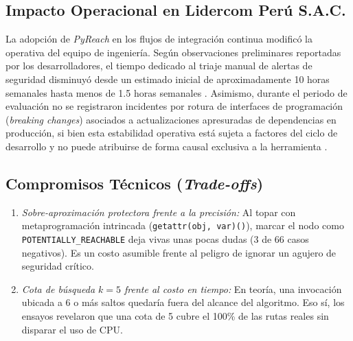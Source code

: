 \documentclass[conference]{IEEEtran}
\begin{document}
\subsection{Impacto Operacional en Lidercom Perú S.A.C.}
La adopción de \textit{PyReach} en los flujos de integración continua modificó la operativa del equipo de ingeniería. Según observaciones preliminares reportadas por los desarrolladores, el tiempo dedicado al triaje manual de alertas de seguridad disminuyó desde un estimado inicial de aproximadamente 10 horas semanales hasta menos de 1.5 horas semanales . Asimismo, durante el periodo de evaluación no se registraron incidentes por rotura de interfaces de programación (\textit{breaking changes}) asociados a actualizaciones apresuradas de dependencias en producción, si bien esta estabilidad operativa está sujeta a factores del ciclo de desarrollo y no puede atribuirse de forma causal exclusiva a la herramienta .

\subsection{Compromisos Técnicos (\textit{Trade-offs})}
\begin{enumerate}
    \item \textit{Sobre-aproximación protectora frente a la precisión:} Al topar con metaprogramación intrincada (\texttt{getattr(obj, var)()}), marcar el nodo como \texttt{POTENTIALLY\_REACHABLE} deja vivas unas pocas dudas (3 de 66 casos negativos). Es un costo asumible frente al peligro de ignorar un agujero de seguridad crítico.
    \item \textit{Cota de búsqueda $k=5$ frente al costo en tiempo:} En teoría, una invocación ubicada a 6 o más saltos quedaría fuera del alcance del algoritmo. Eso sí, los ensayos revelaron que una cota de 5 cubre el 100\% de las rutas reales sin disparar el uso de CPU.
\end{enumerate}
\end{document}
